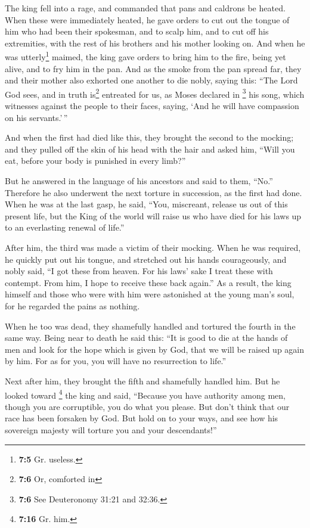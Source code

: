  The king fell into a rage, and commanded that pans and
caldrons be heated.  When these were immediately heated,
he gave orders to cut out the tongue of him who had been their
spokesman, and to scalp him, and to cut off his extremities, with the
rest of his brothers and his mother looking on.  And when
he was utterly\footnote{\textbf{7:5} Gr. useless.} maimed, the king gave
orders to bring him to the fire, being yet alive, and to fry him in the
pan. And as the smoke from the pan spread far, they and their mother
also exhorted one another to die nobly, saying this: 
``The Lord God sees, and in truth is\footnote{\textbf{7:6} Or, comforted
  in} entreated for us, as Moses declared in \footnote{\textbf{7:6} See
  Deuteronomy 31:21 and 32:36.} his song, which witnesses against the
people to their faces, saying, `And he will have compassion on his
servants.'\,''

 And when the first had died like this, they brought the
second to the mocking; and they pulled off the skin of his head with the
hair and asked him, ``Will you eat, before your body is punished in
every limb?''

 But he answered in the language of his ancestors and said
to them, ``No.'' Therefore he also underwent the next torture in
succession, as the first had done.  When he was at the
last gasp, he said, ``You, miscreant, release us out of this present
life, but the King of the world will raise us who have died for his laws
up to an everlasting renewal of life.''

 After him, the third was made a victim of their mocking.
When he was required, he quickly put out his tongue, and stretched out
his hands courageously,  and nobly said, ``I got these
from heaven. For his laws' sake I treat these with contempt. From him, I
hope to receive these back again.''  As a result, the
king himself and those who were with him were astonished at the young
man's soul, for he regarded the pains as nothing.

 When he too was dead, they shamefully handled and
tortured the fourth in the same way.  Being near to death
he said this: ``It is good to die at the hands of men and look for the
hope which is given by God, that we will be raised up again by him. For
as for you, you will have no resurrection to life.''

 Next after him, they brought the fifth and shamefully
handled him.  But he looked toward \footnote{\textbf{7:16}
  Gr. him.} the king and said, ``Because you have authority among men,
though you are corruptible, you do what you please. But don't think that
our race has been forsaken by God.  But hold on to your
ways, and see how his sovereign majesty will torture you and your
descendants!''

